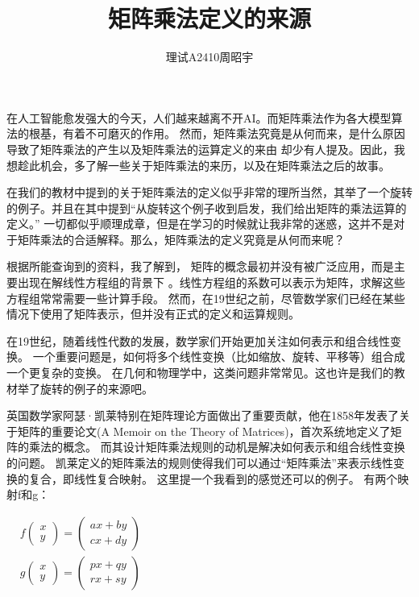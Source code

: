 \documentclass[a4paper]{article}%
\title{\fontsize{18pt}{27pt}\selectfont%
	{\heiti
		矩阵乘法定义的来源}}%
\author{\fontsize{12pt}{18pt}\selectfont%
{\fontsize{10.5pt}{15.75pt}\selectfont%
{\fangsong%
理试A2410周昭宇}}}%
\date{}%
\begin{document}
\maketitle

在人工智能愈发强大的今天，人们越来越离不开AI。而矩阵乘法作为各大模型算法的根基，有着不可磨灭的作用。
然而，矩阵乘法究竟是从何而来，是什么原因导致了矩阵乘法的产生以及矩阵乘法的运算定义的来由
却少有人提及。因此，我想趁此机会，多了解一些关于矩阵乘法的来历，以及在矩阵乘法之后的故事。

在我们的教材中提到的关于矩阵乘法的定义似乎非常的理所当然，其举了一个旋转的例子。并且在其中提到“从旋转这个例子收到启发，我们给出矩阵的乘法运算的定义。”
一切都似乎顺理成章，但是在学习的时候就让我非常的迷惑，这并不是对于矩阵乘法的合适解释。那么，矩阵乘法的定义究竟是从何而来呢？

根据所能查询到的资料，我了解到，
矩阵的概念最初并没有被广泛应用，而是主要出现在解线性方程组的背景下
。线性方程组的系数可以表示为矩阵，求解这些方程组常常需要一些计算手段。
然而，在19世纪之前，尽管数学家们已经在某些情况下使用了矩阵表示，但并没有正式的定义和运算规则。

在19世纪，随着线性代数的发展，数学家们开始更加关注如何表示和组合线性变换。
一个重要问题是，如何将多个线性变换（比如缩放、旋转、平移等）组合成一个更复杂的变换。
在几何和物理学中，这类问题非常常见。这也许是我们的教材举了旋转的例子的来源吧。

英国数学家阿瑟·凯莱特别在矩阵理论方面做出了重要贡献，他在1858年发表了关于矩阵的重要论文(A Memoir on the Theory of Matrices)，首次系统地定义了矩阵的乘法的概念。
而其设计矩阵乘法规则的动机是解决如何表示和组合线性变换的问题。
凯莱定义的矩阵乘法的规则使得我们可以通过“矩阵乘法”来表示线性变换的复合，即线性复合映射。
这里提一个我看到的感觉还可以的例子。
有两个映射f和g：
\begin{center}
$
\begin{aligned}
&f\begin{pmatrix}
    x \\
    y
\end{pmatrix}=\begin{pmatrix}
    ax + by \\
    cx + dy
\end{pmatrix}\\
&g\begin{pmatrix}
    x \\
    y
\end{pmatrix}=\begin{pmatrix}
    px + qy \\
    rx + sy
\end{pmatrix}
\end{aligned}
$
\end{center}
\end{document}
